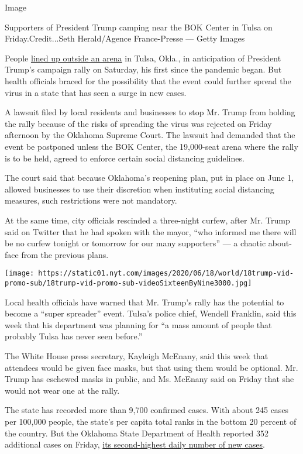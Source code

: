 Image

Supporters of President Trump camping near the BOK Center in Tulsa on
Friday.Credit...Seth Herald/Agence France-Presse --- Getty Images

People
\href{https://www.nytimes.com/video/us/politics/100000007199618/trump-tulsa-rally-supporters-coronavirus.html}{lined
up outside an arena} in Tulsa, Okla., in anticipation of President
Trump's campaign rally on Saturday, his first since the pandemic began.
But health officials braced for the possibility that the event could
further spread the virus in a state that has seen a surge in new cases.

A lawsuit filed by local residents and businesses to stop Mr. Trump from
holding the rally because of the risks of spreading the virus was
rejected on Friday afternoon by the Oklahoma Supreme Court. The lawsuit
had demanded that the event be postponed unless the BOK Center, the
19,000-seat arena where the rally is to be held, agreed to enforce
certain social distancing guidelines.

The court said that because Oklahoma's reopening plan, put in place on
June 1, allowed businesses to use their discretion when instituting
social distancing measures, such restrictions were not mandatory.

At the same time, city officials rescinded a three-night curfew, after
Mr. Trump said on Twitter that he had spoken with the mayor, ``who
informed me there will be no curfew tonight or tomorrow for our many
supporters'' --- a chaotic about-face from the previous plans.

\texttt{[image: https://static01.nyt.com/images/2020/06/18/world/18trump-vid-promo-sub/18trump-vid-promo-sub-videoSixteenByNine3000.jpg]}

Local health officials have warned that Mr. Trump's rally has the
potential to become a ``super spreader'' event. Tulsa's police chief,
Wendell Franklin, said this week that his department was planning for
``a mass amount of people that probably Tulsa has never seen before.''

The White House press secretary, Kayleigh McEnany, said this week that
attendees would be given face masks, but that using them would be
optional. Mr. Trump has eschewed masks in public, and Ms. McEnany said
on Friday that she would not wear one at the rally.

The state has recorded more than 9,700 confirmed cases. With about 245
cases per 100,000 people, the state's per capita total ranks in the
bottom 20 percent of the country. But the Oklahoma State Department of
Health reported 352 additional cases on Friday,
\href{https://www.nytimes.com/interactive/2020/us/oklahoma-coronavirus-cases.html}{its
second-highest daily number of new cases}.

